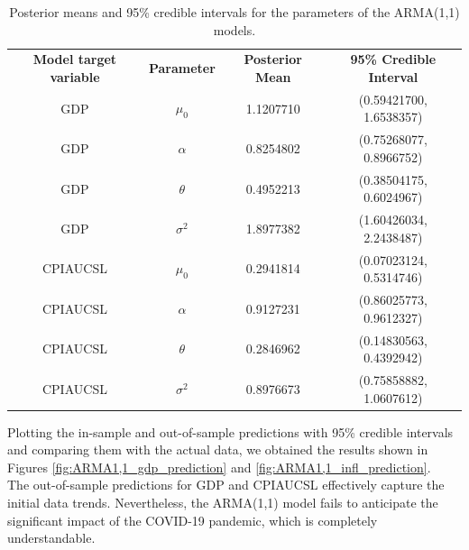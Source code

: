 \begin{table}[H]
    \centering
    \begin{tabular}{c|c|c|c}
        \textbf{Model target variable } & \textbf{Parameter } & \textbf{Posterior Mean } & \textbf{95\% Credible Interval } \\
        \cline{1-4}
        GDP      & $\mu_0$    & 1.1207710 & (0.59421700, 1.6538357) \\
        GDP      & $\alpha$   & 0.8254802 & (0.75268077, 0.8966752) \\
        GDP      & $\theta$   & 0.4952213 & (0.38504175, 0.6024967) \\
        GDP      & $\sigma^2$ & 1.8977382 & (1.60426034, 2.2438487) \\
        CPIAUCSL & $\mu_0$    & 0.2941814 & (0.07023124, 0.5314746) \\
        CPIAUCSL & $\alpha$   & 0.9127231 & (0.86025773, 0.9612327) \\
        CPIAUCSL & $\theta$   & 0.2846962 & (0.14830563, 0.4392942) \\
        CPIAUCSL & $\sigma^2$ & 0.8976673 & (0.75858882, 1.0607612) \\
    \end{tabular}
    \caption{Posterior means and 95\% credible intervals for the parameters of the ARMA(1,1) models.}
    \label{tab:ARMA1,1_posteriors}
\end{table}
Plotting the in-sample and out-of-sample predictions with 95\% credible intervals and comparing them with the actual data, we obtained the results shown in Figures \ref{fig:ARMA1,1_gdp_prediction} and \ref{fig:ARMA1,1_infl_prediction}. \\
The out-of-sample predictions for GDP and CPIAUCSL effectively capture the initial data trends. Nevertheless, the ARMA(1,1) model fails to anticipate the significant impact of the COVID-19 pandemic, which is completely understandable.
